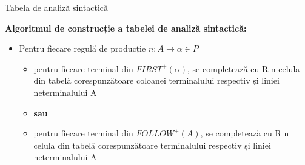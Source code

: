 \documentclass[pdf]{beamer}
\begin{document}
\begin{frame}{Tabela de analiză sintactică}

\textbf{Algoritmul de construcție a tabelei de analiză sintactică:}

\begin{itemize}
\item
Pentru fiecare regulă de producție $n: A \rightarrow \alpha \in P$

\begin{itemize}
\item
pentru fiecare terminal din $FIRST^+(\alpha)$, se completează cu R n celula din tabelă corespunzătoare coloanei terminalului respectiv și liniei neterminalului A

\item
\textbf{sau}

\item
pentru fiecare terminal din $FOLLOW^+(A)$, se completează cu R n celula din tabelă corespunzătoare terminalului respectiv și liniei neterminalului A
\end{itemize}
\end{itemize}
\end{frame}
\end{document}
